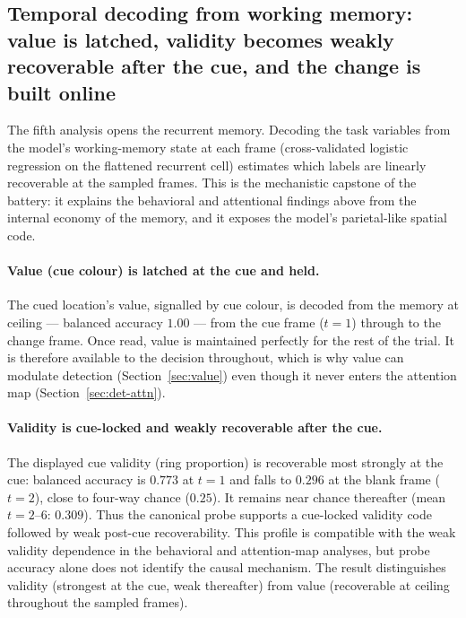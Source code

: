 \subsection{Temporal decoding from working memory: value is latched, validity becomes
            weakly recoverable after the cue, and the change is built online}
\label{sec:det-decoding}

The fifth analysis opens the recurrent memory. Decoding the task variables from the
model's working-memory state at each frame (cross-validated logistic regression on
the flattened recurrent cell) estimates which labels are linearly recoverable at the
sampled frames. This is
the mechanistic capstone of the battery: it explains the behavioral and attentional
findings above from the internal economy of the memory, and it exposes the model's
parietal-like spatial code.

\paragraph{Value (cue colour) is latched at the cue and held.}
The cued location's value, signalled by cue colour, is decoded from the memory at
ceiling --- balanced accuracy $1.00$ --- from the cue frame ($t = 1$) through to the
change frame. Once read, value is maintained perfectly for the rest of the trial. It
is therefore available to the decision throughout, which is why value can modulate
detection (Section~\ref{sec:value}) even though it never enters the attention map
(Section~\ref{sec:det-attn}).

\paragraph{Validity is cue-locked and weakly recoverable after the cue.}
The displayed cue validity (ring proportion) is recoverable most strongly at the cue:
balanced accuracy is $0.773$ at $t=1$ and falls to $0.296$ at the blank frame
($t=2$), close to four-way chance ($0.25$). It remains near chance thereafter
(mean $t=2$--$6$: $0.309$). Thus the canonical probe supports a cue-locked validity
code followed by weak post-cue recoverability. This profile is compatible with the weak validity dependence in
the behavioral and attention-map analyses, but probe accuracy alone does not identify
the causal mechanism. The result distinguishes validity (strongest at the cue, weak
thereafter) from value (recoverable at ceiling throughout the sampled frames).

